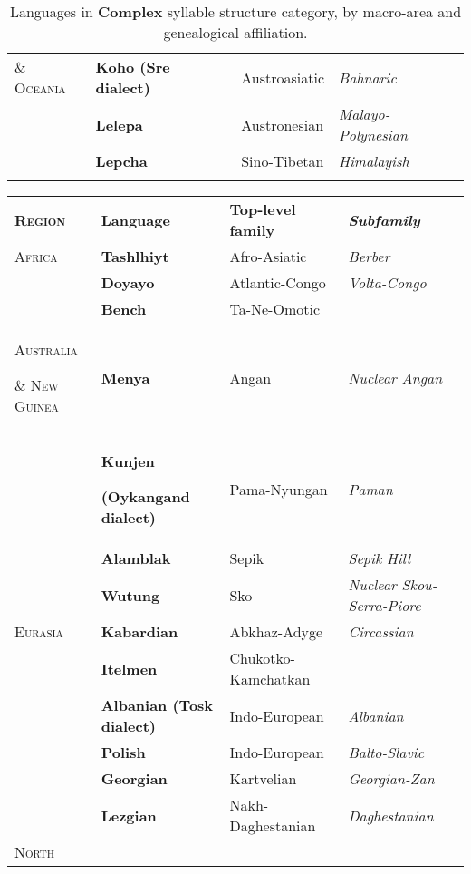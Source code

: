 \begin{table}
\begin{tabularx}{\textwidth}{XXXX}
\textsc{\&} \textsc{Oceania} & \textbf{Koho (Sre dialect)} & Austroasiatic & \textit{Bahnaric}\\
\hhline{-~~~} & \textbf{Lelepa} & Austronesian & \textit{Malayo-Polynesian}\\
& \textbf{Lepcha} & Sino-Tibetan & \textit{Himalayish}\\
\hhline{~---}
\lspbottomrule
\end{tabularx}
\caption{\label{tab:2.6}Languages in \textbf{Complex} syllable structure category, by macro-area and genealogical affiliation.}
\end{table}




\begin{table}
\begin{tabularx}{\textwidth}{XXXX}
\lsptoprule

\textbf{\textsc{Region}} & \textbf{Language} & \textbf{Top-level family} & \textbf{\textit{Subfamily}}\\
\textsc{Africa} & \textbf{Tashlhiyt} & Afro-Asiatic & \textit{Berber}\\
\hhline{-~~~} & \textbf{Doyayo} & Atlantic-Congo & \textit{Volta-Congo}\\
& \textbf{Bench} & Ta-Ne-Omotic & \\
\textsc{Australia} 

\textsc{\&} \textsc{New} \textsc{Guinea} & \textbf{Menya} & Angan & \textit{Nuclear Angan}\\
\hhline{-~~~} & \textbf{Kunjen} 

\textbf{(Oykangand dialect)} & Pama-Nyungan & \textit{Paman}\\
& \textbf{Alamblak} & Sepik & \textit{Sepik Hill}\\
& \textbf{Wutung} & Sko & \textit{Nuclear Skou-Serra-Piore}\\
\textsc{Eurasia} & \textbf{Kabardian} & Abkhaz-Adyge & \textit{Circassian}\\
\hhline{-~~~} & \textbf{Itelmen} & Chukotko-Kamchatkan & \\
& \textbf{Albanian (Tosk dialect)} & Indo-European & \textit{Albanian}\\
& \textbf{Polish} & Indo-European & \textit{Balto-Slavic}\\
& \textbf{Georgian} & Kartvelian & \textit{Georgian-Zan}\\
& \textbf{Lezgian} & Nakh-Daghestanian & \textit{Daghestanian}\\
\textsc{North} 


\end{tabularx}
\end{table}
